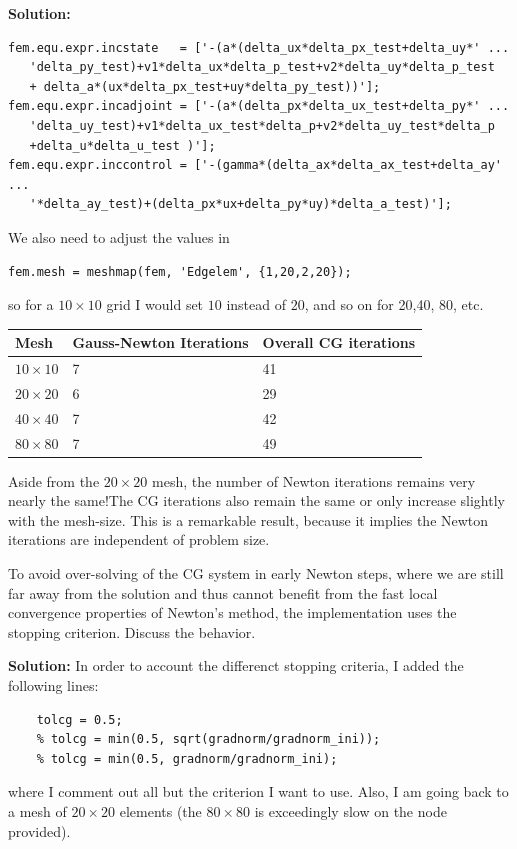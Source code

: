 \documentclass[11pt]{article}
\newenvironment{solution}{\begin{trivlist}\item[]{\bf Solution:}}
                      {\end{trivlist}}
\begin{document}
\begin{enumerate}
\begin{solution}
\begin{lstlisting}
fem.equ.expr.incstate   = ['-(a*(delta_ux*delta_px_test+delta_uy*' ...
   'delta_py_test)+v1*delta_ux*delta_p_test+v2*delta_uy*delta_p_test
   + delta_a*(ux*delta_px_test+uy*delta_py_test))'];
fem.equ.expr.incadjoint = ['-(a*(delta_px*delta_ux_test+delta_py*' ...
   'delta_uy_test)+v1*delta_ux_test*delta_p+v2*delta_uy_test*delta_p
   +delta_u*delta_u_test )'];
fem.equ.expr.inccontrol = ['-(gamma*(delta_ax*delta_ax_test+delta_ay' ...
   '*delta_ay_test)+(delta_px*ux+delta_py*uy)*delta_a_test)'];
\end{lstlisting}
We also need to adjust the values in
\begin{lstlisting}
fem.mesh = meshmap(fem, 'Edgelem', {1,20,2,20});
\end{lstlisting}
so for a $10\times 10$ grid I would set $10$ instead of $20$, and so on 
 for 20,40, 80, etc. 
 
\begin{center}
\begin{tabular}{l||l|l}
 Mesh & Gauss-Newton Iterations & Overall CG iterations\\
\hline\hline
$10\times 10$ & 7 & 41\\
$20\times 20$ & 6 & 29\\
$40\times 40$ & 7 & 42\\
$80\times 80$ & 7 & 49
\end{tabular}
\end{center}

Aside from the $20\times20$ mesh, the number of Newton iterations
 remains very nearly the same!The CG iterations also remain the same or only
 increase slightly with the mesh-size. This is a remarkable result,
 because it implies the Newton iterations are independent of problem
 size. 

\end{solution}

\item[(c)]To avoid over-solving of the CG system in early Newton steps,
	  where we are still far away from the solution and thus cannot
	  benefit from the fast local convergence properties of Newton's
	  method, the implementation uses the stopping
	  criterion. Discuss the behavior.  


\begin{solution}
In order to account the differenct stopping criteria, I added the following lines:
\begin{lstlisting}
    tolcg = 0.5;
    % tolcg = min(0.5, sqrt(gradnorm/gradnorm_ini));
    % tolcg = min(0.5, gradnorm/gradnorm_ini);
\end{lstlisting}
where I comment out all but the criterion I want to use. Also, I am
 going back to a mesh of $20\times 20$ elements (the $80\times 80$ is
 exceedingly slow on the node provided). 


\end{solution}
\end{enumerate}
\end{document}
